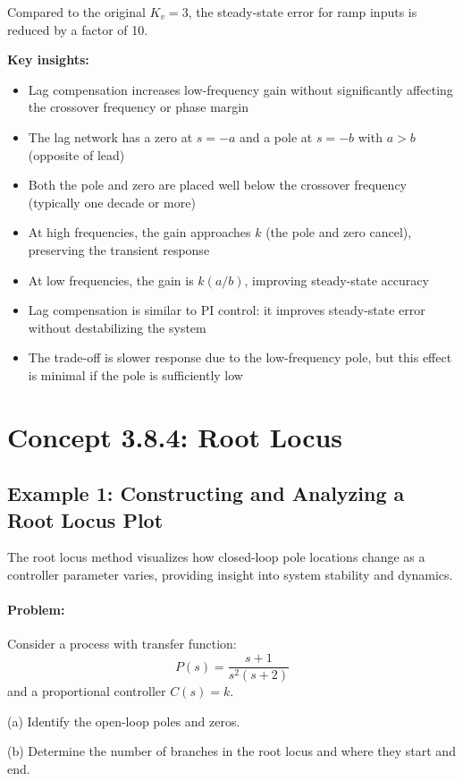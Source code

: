 \documentclass[11pt,a4paper]{article}
\begin{document}
Compared to the original $K_v = 3$, the steady-state error for ramp inputs is reduced by a factor of 10.

\textbf{Key insights:}
\begin{itemize}
\item Lag compensation increases low-frequency gain without significantly affecting the crossover frequency or phase margin
\item The lag network has a zero at $s = -a$ and a pole at $s = -b$ with $a > b$ (opposite of lead)
\item Both the pole and zero are placed well below the crossover frequency (typically one decade or more)
\item At high frequencies, the gain approaches $k$ (the pole and zero cancel), preserving the transient response
\item At low frequencies, the gain is $k(a/b)$, improving steady-state accuracy
\item Lag compensation is similar to PI control: it improves steady-state error without destabilizing the system
\item The trade-off is slower response due to the low-frequency pole, but this effect is minimal if the pole is sufficiently low
\end{itemize}

\section{Concept 3.8.4: Root Locus}

\subsection{Example 1: Constructing and Analyzing a Root Locus Plot}

The root locus method visualizes how closed-loop pole locations change as a controller parameter varies, providing insight into system stability and dynamics.

\paragraph{Problem:}
Consider a process with transfer function:
\[
P(s) = \frac{s+1}{s^2(s+2)}
\]
and a proportional controller $C(s) = k$.

(a) Identify the open-loop poles and zeros.

(b) Determine the number of branches in the root locus and where they start and end.
\end{document}
